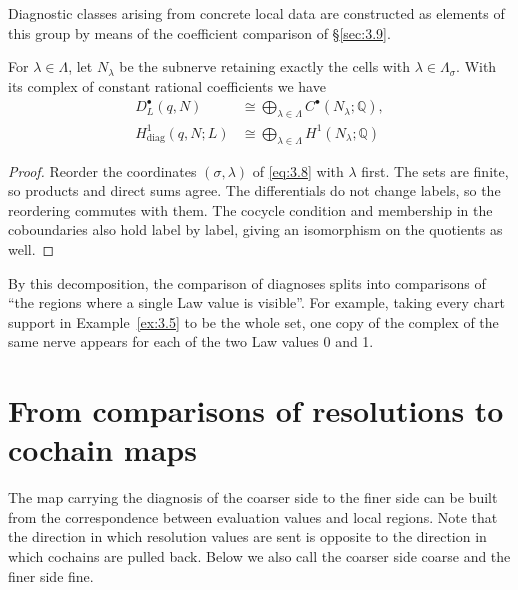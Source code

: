 Diagnostic classes arising from concrete local data are constructed as elements of
this group by means of the coefficient comparison of \S\ref{sec:3.9}.

\begin{proposition}\label{prop:3.12}

For $\lambda\in\Lambda$, let $N_\lambda$ be the subnerve retaining exactly the cells
with $\lambda\in\Lambda_\sigma$. With its complex of constant rational coefficients
we have
\begin{equation*}
\begin{aligned}
D_L^\bullet(q,N)
&\cong\bigoplus_{\lambda\in\Lambda}C^\bullet(N_\lambda;\mathbb{Q}),\\
H^1_{\mathrm{diag}}(q,N;L)
&\cong\bigoplus_{\lambda\in\Lambda}H^1(N_\lambda;\mathbb{Q})
\end{aligned}
\tag{3.11}\label{eq:3.11}
\end{equation*}
\end{proposition}

\begin{proof}

Reorder the coordinates $(\sigma,\lambda)$ of \eqref{eq:3.8} with $\lambda$ first.
The sets are finite, so products and direct sums agree.
The differentials do not change labels, so the reordering commutes with them.
The cocycle condition and membership in the coboundaries also hold label by label,
giving an isomorphism on the quotients as well.

\end{proof}

By this decomposition, the comparison of diagnoses splits into comparisons of ``the
regions where a single Law value is visible''. For example, taking every chart support
in Example~\ref{ex:3.5} to be the whole set, one copy of the complex of the same nerve
appears for each of the two Law values 0 and 1.

\section{From comparisons of resolutions to cochain maps}\label{sec:3.4}

The map carrying the diagnosis of the coarser side to the finer side can be built
from the correspondence between evaluation values and local regions.
Note that the direction in which resolution values are sent is opposite to the
direction in which cochains are pulled back.
Below we also call the coarser side coarse and the finer side fine.

